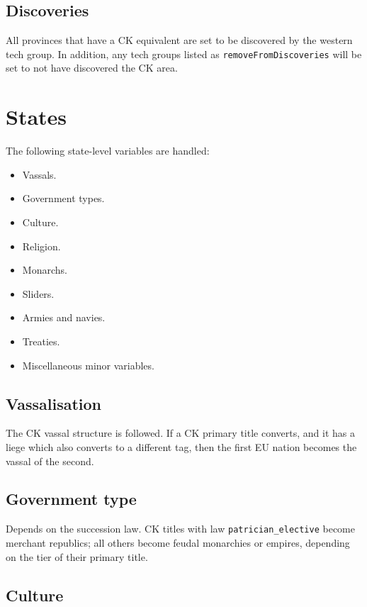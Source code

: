 \documentclass[12pt,ebook,oneside]{book}
\begin{document}
\section{Discoveries}

All provinces that have a CK equivalent are set to be discovered by
the western tech group. In addition, any tech groups listed as
\verb|removeFromDiscoveries| will be set to not have discovered the CK
area. 

\chapter{States}

The following state-level variables are handled:
\begin{itemize}
\item Vassals.
\item Government types. 
\item Culture. 
\item Religion. 
\item Monarchs. 
\item Sliders.
\item Armies and navies. 
\item Treaties. 
\item Miscellaneous minor variables. 
\end{itemize}

\section{Vassalisation}

The CK vassal structure is followed. If a CK primary title converts,
and it has a liege which also converts to a different tag, then the first EU nation
becomes the vassal of the second. 

\section{Government type}

Depends on the succession law. CK titles with law
\verb|patrician_elective| become merchant republics; all others
become feudal monarchies or empires, depending on the tier of their
primary title. 

\section{Culture}
\end{document}
